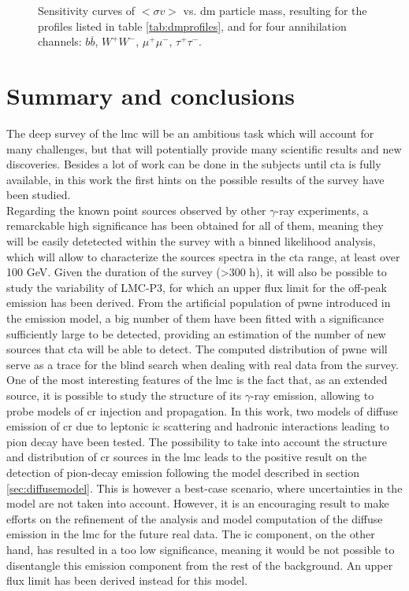 \documentclass[main.tex]{subfiles}
\begin{document}
\begin{figure}
\endminipage
  \caption{Sensitivity curves of $<\sigma v >$ vs. \gls{dm} particle mass, resulting for the profiles listed in table \ref{tab:dmprofiles}, and for four annihilation channels: $b\overline b$, $W^+W^-$, $\mu^+ \mu^-$, $\tau^+ \tau^-$.}
    \label{fig:dmsensicurves}
\end{figure}

\section{Summary and conclusions}

The deep survey of the \gls{lmc} will be an ambitious task which will account for many challenges, but that will potentially provide many scientific results and new discoveries. Besides a lot of work can be done in the subjects until \gls{cta} is fully available, in this work the first hints on the possible results of the survey have been studied.\\
Regarding the known point sources observed by other $\gamma$-ray experiments, a remarckable high significance has been obtained for all of them, meaning they will be easily detetected within the survey with a binned likelihood analysis, which will allow to characterize the sources spectra in the \gls{cta} range, at least over 100 GeV. Given the duration of the survey (>300 h), it will also be possible to study the variability of LMC-P3, for which an upper flux limit for the off-peak emission has been derived. From the artificial population of \gls{pwne} introduced in the emission model, a big number of them have been fitted with a significance sufficiently large to be detected, providing an estimation of the number of new sources that \gls{cta} will be able to detect. The computed distribution of \gls{pwne} will serve as a trace for the blind search when dealing with real data from the survey.\\
One of the most interesting features of the \gls{lmc} is the fact that, as an extended source, it is possible to study the structure of its $\gamma$-ray emission, allowing to probe models of \gls{cr} injection and propagation. In this work, two models of diffuse emission of \gls{cr} due to leptonic \gls{ic} scattering and hadronic interactions leading to pion decay have been tested. The possibility to take into account the structure and distribution of \gls{cr} sources in the \gls{lmc} leads to the positive result on the detection of pion-decay emission following the model described in section \ref{sec:diffusemodel}. This is however a best-case scenario, where uncertainties in the model are not taken into account. However, it is an encouraging result to make efforts on the refinement of the analysis and model computation of the diffuse emission in the \gls{lmc} for the future real data. The \gls{ic} component, on the other hand, has resulted in a too low significance, meaning it would be not possible to disentangle this emission component from the rest of the background. An upper flux limit has been derived instead for this model.\\
\end{document}
